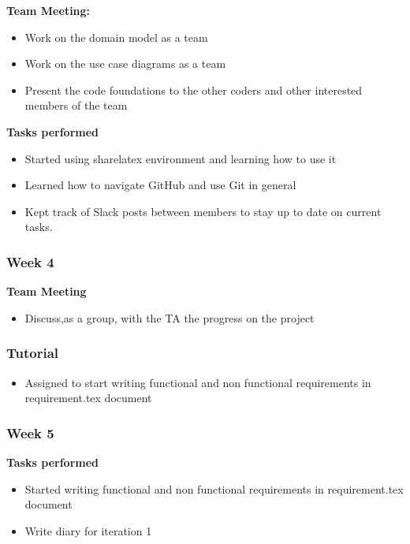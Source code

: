 \documentclass[11pt]{article}
\begin{document}
\textbf{Team Meeting:}
\begin{itemize}
    \item Work on the domain model as a team
    \item Work on the use case diagrams as a team
    \item Present the code foundations to the other coders and other interested members of the team
\end{itemize}

\textbf{Tasks performed}
\begin{itemize}
    \item Started using sharelatex environment and learning how to use it
    \item Learned how to navigate GitHub and use Git in general
    \item Kept track of Slack posts between members to stay up to date on current tasks.  
\end{itemize}

\subsubsection{Week 4}

\textbf{Team Meeting}
\begin{itemize}
    \item Discuss,as a group, with the TA the progress on the project
\end{itemize}


\subsubsection{Tutorial}
\begin{itemize}
    \item Assigned to start writing functional and non functional requirements in requirement.tex document
\end{itemize}

\subsubsection{Week 5}

\textbf{Tasks performed}
\begin{itemize}
    \item Started writing functional and non functional requirements in requirement.tex document
    \item Write diary for iteration 1
\end{itemize}
\end{document}
